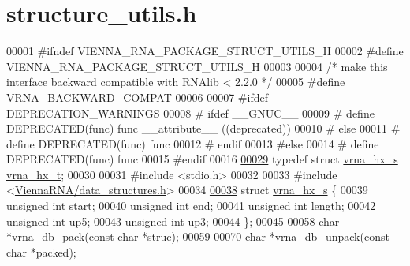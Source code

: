 \hypertarget{structure__utils_8h_source}{}\section{structure\+\_\+utils.\+h}
\label{structure__utils_8h_source}

\begin{DoxyCode}
00001 \textcolor{preprocessor}{#ifndef VIENNA\_RNA\_PACKAGE\_STRUCT\_UTILS\_H}
00002 \textcolor{preprocessor}{#define VIENNA\_RNA\_PACKAGE\_STRUCT\_UTILS\_H}
00003 
00004 \textcolor{comment}{/* make this interface backward compatible with RNAlib < 2.2.0 */}
00005 \textcolor{preprocessor}{#define VRNA\_BACKWARD\_COMPAT}
00006 
00007 \textcolor{preprocessor}{#ifdef DEPRECATION\_WARNINGS}
00008 \textcolor{preprocessor}{# ifdef \_\_GNUC\_\_}
00009 \textcolor{preprocessor}{#  define DEPRECATED(func) func \_\_attribute\_\_ ((deprecated))}
00010 \textcolor{preprocessor}{# else}
00011 \textcolor{preprocessor}{#  define DEPRECATED(func) func}
00012 \textcolor{preprocessor}{# endif}
00013 \textcolor{preprocessor}{#else}
00014 \textcolor{preprocessor}{# define DEPRECATED(func) func}
00015 \textcolor{preprocessor}{#endif}
00016 
\hypertarget{structure__utils_8h_source.tex_l00029}{}\hyperlink{group__struct__utils_ga877363f3a1703b53ecd025c6fcf897a0}{00029} \textcolor{keyword}{typedef} \textcolor{keyword}{struct }\hyperlink{group__struct__utils_structvrna__hx__s}{vrna\_hx\_s}  \hyperlink{group__struct__utils_structvrna__hx__s}{vrna\_hx\_t};
00030 
00031 \textcolor{preprocessor}{#include <stdio.h>}
00032 
00033 \textcolor{preprocessor}{#include <\hyperlink{data__structures_8h}{ViennaRNA/data\_structures.h}>}
00034 
\hypertarget{structure__utils_8h_source.tex_l00038}{}\hyperlink{group__struct__utils}{00038} \textcolor{keyword}{struct }\hyperlink{group__struct__utils_structvrna__hx__s}{vrna\_hx\_s} \{
00039   \textcolor{keywordtype}{unsigned} \textcolor{keywordtype}{int} start;
00040   \textcolor{keywordtype}{unsigned} \textcolor{keywordtype}{int} end;
00041   \textcolor{keywordtype}{unsigned} \textcolor{keywordtype}{int} length;
00042   \textcolor{keywordtype}{unsigned} \textcolor{keywordtype}{int} up5;
00043   \textcolor{keywordtype}{unsigned} \textcolor{keywordtype}{int} up3;
00044 \};
00045 
00058 \textcolor{keywordtype}{char} *\hyperlink{group__struct__utils_ga55c4783060a1464f862f858d5599c9e1}{vrna\_db\_pack}(\textcolor{keyword}{const} \textcolor{keywordtype}{char} *struc);
00059 
00070 \textcolor{keywordtype}{char} *\hyperlink{group__struct__utils_ga6490adff857d84ce06e6f379ae3a4512}{vrna\_db\_unpack}(\textcolor{keyword}{const} \textcolor{keywordtype}{char} *packed);

\end{DoxyCode}
